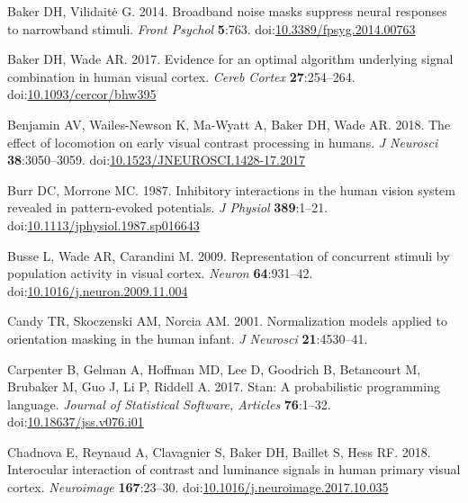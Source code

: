 \documentclass[]{article}
\begin{document}
\leavevmode\hypertarget{ref-Baker2014}{}%
Baker DH, Vilidaitė G. 2014. Broadband noise masks suppress neural responses to narrowband stimuli. \emph{Front Psychol} \textbf{5}:763. doi:\href{https://doi.org/10.3389/fpsyg.2014.00763}{10.3389/fpsyg.2014.00763}

\leavevmode\hypertarget{ref-Baker2017}{}%
Baker DH, Wade AR. 2017. Evidence for an optimal algorithm underlying signal combination in human visual cortex. \emph{Cereb Cortex} \textbf{27}:254--264. doi:\href{https://doi.org/10.1093/cercor/bhw395}{10.1093/cercor/bhw395}

\leavevmode\hypertarget{ref-Benjamin2018}{}%
Benjamin AV, Wailes-Newson K, Ma-Wyatt A, Baker DH, Wade AR. 2018. The effect of locomotion on early visual contrast processing in humans. \emph{J Neurosci} \textbf{38}:3050--3059. doi:\href{https://doi.org/10.1523/JNEUROSCI.1428-17.2017}{10.1523/JNEUROSCI.1428-17.2017}

\leavevmode\hypertarget{ref-Burr1987}{}%
Burr DC, Morrone MC. 1987. Inhibitory interactions in the human vision system revealed in pattern-evoked potentials. \emph{J Physiol} \textbf{389}:1--21. doi:\href{https://doi.org/10.1113/jphysiol.1987.sp016643}{10.1113/jphysiol.1987.sp016643}

\leavevmode\hypertarget{ref-Busse2009}{}%
Busse L, Wade AR, Carandini M. 2009. Representation of concurrent stimuli by population activity in visual cortex. \emph{Neuron} \textbf{64}:931--42. doi:\href{https://doi.org/10.1016/j.neuron.2009.11.004}{10.1016/j.neuron.2009.11.004}

\leavevmode\hypertarget{ref-Candy2001}{}%
Candy TR, Skoczenski AM, Norcia AM. 2001. Normalization models applied to orientation masking in the human infant. \emph{J Neurosci} \textbf{21}:4530--41.

\leavevmode\hypertarget{ref-Carpenter2017}{}%
Carpenter B, Gelman A, Hoffman MD, Lee D, Goodrich B, Betancourt M, Brubaker M, Guo J, Li P, Riddell A. 2017. Stan: A probabilistic programming language. \emph{Journal of Statistical Software, Articles} \textbf{76}:1--32. doi:\href{https://doi.org/10.18637/jss.v076.i01}{10.18637/jss.v076.i01}

\leavevmode\hypertarget{ref-Chadnova2018}{}%
Chadnova E, Reynaud A, Clavagnier S, Baker DH, Baillet S, Hess RF. 2018. Interocular interaction of contrast and luminance signals in human primary visual cortex. \emph{Neuroimage} \textbf{167}:23--30. doi:\href{https://doi.org/10.1016/j.neuroimage.2017.10.035}{10.1016/j.neuroimage.2017.10.035}
\end{document}
